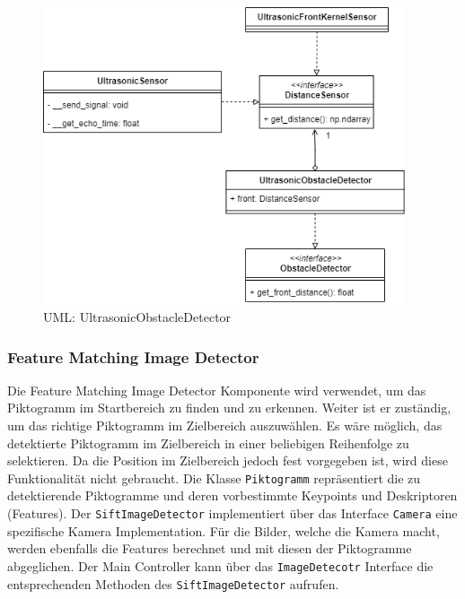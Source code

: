 \begin{figure}[H]
  \includegraphics[width=0.95\textwidth]{img/softwarearchitektur/UML-UltrasonicObstacleDetector.png}
  \centering
  \caption{UML: UltrasonicObstacleDetector}
  \label{fig:uml-ultrasonic-obstacle-detector}
\end{figure}

\newpage

\subsubsection{Feature Matching Image Detector}
\label{sec:architecture-feature-matching}
Die Feature Matching Image Detector Komponente wird verwendet, um das Piktogramm im Startbereich zu finden und zu erkennen. Weiter ist er zuständig, um das richtige Piktogramm im Zielbereich auszuwählen. Es wäre möglich, das detektierte Piktogramm im Zielbereich in einer beliebigen Reihenfolge zu selektieren. Da die Position im Zielbereich jedoch fest vorgegeben ist, wird diese Funktionalität nicht gebraucht.
Die Klasse \texttt{Piktogramm} repräsentiert die zu detektierende Piktogramme und deren vorbestimmte Keypoints und Deskriptoren (Features). Der \texttt{SiftImageDetector} implementiert über das Interface \texttt{Camera} eine spezifische Kamera Implementation. Für die Bilder, welche die Kamera macht, werden ebenfalls die Features berechnet und mit diesen der Piktogramme abgeglichen. Der Main Controller kann über das \texttt{ImageDetecotr} Interface die entsprechenden Methoden des \texttt{SiftImageDetector} aufrufen.

